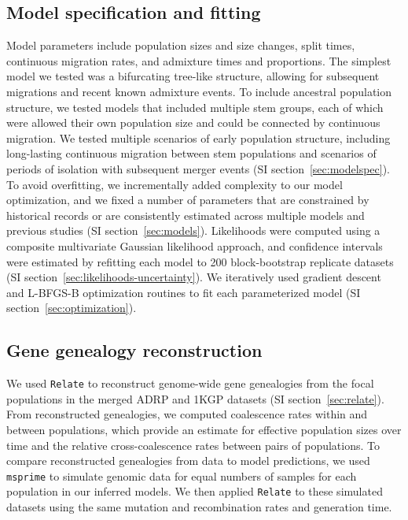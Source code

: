 \documentclass[]{article}
\begin{document}
\subsection*{Model specification and fitting}

Model parameters include population sizes and size changes, split times,
continuous migration rates, and admixture times and proportions. The simplest
model we tested was a bifurcating tree-like structure, allowing for subsequent
migrations and recent known admixture events. To include ancestral population
structure, we tested models that included multiple stem groups, each of which were
allowed their own population size and could be connected by continuous
migration. We tested multiple scenarios of early population structure,
including long-lasting continuous migration between stem populations and
scenarios of periods of isolation with subsequent merger events (SI
section~\ref{sec:modelspec}). To avoid overfitting, we incrementally added
complexity to our model optimization, and we fixed a number of parameters that
are constrained by historical records or are consistently estimated across
multiple models and previous studies (SI section~\ref{sec:models}). Likelihoods
were computed using a composite multivariate Gaussian likelihood approach, and
confidence intervals were estimated by refitting each model to 200
block-bootstrap replicate datasets (SI
section~\ref{sec:likelihoods-uncertainty}). We iteratively used gradient
descent and L-BFGS-B optimization routines to fit each parameterized model (SI
section~\ref{sec:optimization}).

\subsection*{Gene genealogy reconstruction}

We used \texttt{Relate} \citep{Speidel2019-nj} to reconstruct genome-wide gene
genealogies from the focal populations in the merged ADRP and 1KGP datasets
(SI section~\ref{sec:relate}). From reconstructed genealogies, we computed
coalescence rates within and between populations, which provide an estimate for
effective population sizes over time and the relative cross-coalescence rates
between pairs of populations. To compare reconstructed genealogies from data to
model predictions, we used \texttt{msprime}
\citep{Kelleher2016-lw,Baumdicker2022-mj} to simulate genomic data for equal
numbers of samples for each population in our inferred models. We then applied
\texttt{Relate} to these simulated datasets using the same mutation and
recombination rates and generation time.
\end{document}
